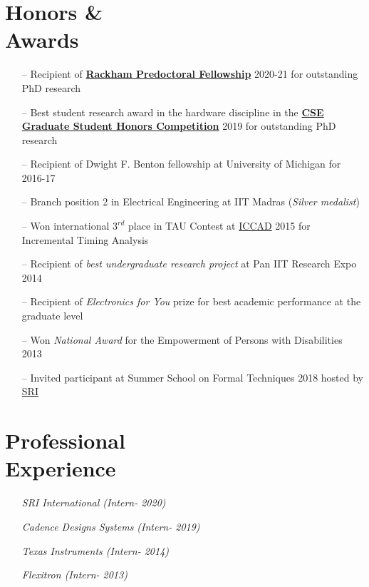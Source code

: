 \documentclass[line,margin,letter]{resume}
\begin{document}
\begin{resume}
\section{\mysidestyle Honors \& \\ Awards}
    \noindent
    \begin{itemize}[leftmargin=*]
    \item[--] Recipient of \href{https://news.engin.umich.edu/2020/03/predoctoral-fellowship-for-mathematically-provable-hardware-design/}{\textbf{Rackham Predoctoral Fellowship}} 2020-21 for outstanding PhD research
    \item[--] Best student research award in the hardware discipline in the \href{https://cse.engin.umich.edu/stories/2019-cse-graduate-student-honors-competition-highlights-outstanding-research}{\textbf{CSE Graduate Student Honors Competition}} 2019 for outstanding PhD research
    \item[--] Recipient of Dwight F. Benton fellowship at University of Michigan for 2016-17
    \item[--] Branch position 2 in Electrical Engineering at IIT Madras (\textit{Silver medalist})
    \item[--] Won international $3^{rd}$ place in TAU Contest at \href{https://iccad.com/}{ICCAD} 2015 for Incremental Timing Analysis
    \item[--] Recipient of \textit{best undergraduate research project} at Pan IIT Research Expo 2014
    \item[--] Recipient of \textit{Electronics for You} prize for best academic performance at the graduate level
    \item[--] Won \textit{National Award} for the Empowerment of Persons with Disabilities 2013
    \item[--] Invited participant at Summer School on Formal Techniques 2018 hosted by \href{http://csl.sri.com/}{SRI}
    \end{itemize}

\section{\mysidestyle Professional \\ Experience}
    \vspace{-0.02cm}
        \begin{multicols}{2}
        \begin{itemize}
        \item[] \emph{SRI International (Intern- 2020)}
        \item[] \emph{Cadence Designs Systems  (Intern- 2019)}
        \item[] \emph{Texas Instruments (Intern- 2014)}
        \item[] \emph{Flexitron (Intern- 2013)}
        \end{itemize}
        \end{multicols}


\end{resume}
\end{document}
